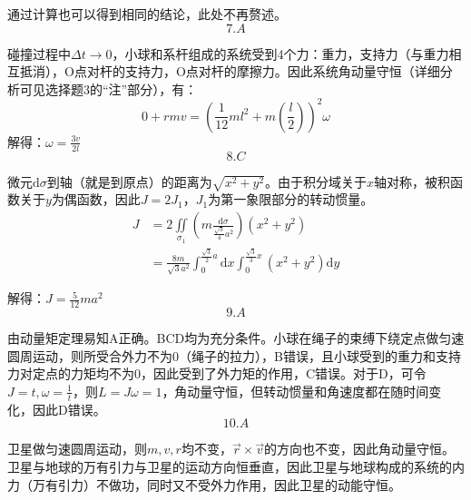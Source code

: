 \documentclass[blue, pad]{./templete/qyxfnote}
\newcommand{\di}[1]{\mathrm{d}#1}
\newcommand{\zbj}[4]
{
	\draw (0,0) node[below left] {$ O $};
	\draw [->] (#1,0) -- (#2,0) node[right] {$ x $};
	\draw [->] (0,#3) -- (0,#4) node[right] {$ y $};
}
\begin{document}
			通过计算也可以得到相同的结论，此处不再赘述。
			\[7.A\]\par
			碰撞过程中$ \Delta t\to 0 $，小球和系杆组成的系统受到4个力：重力，支持力（与重力相互抵消），O点对杆的支持力，O点对杆的摩擦力。因此系统角动量守恒（详细分析可见选择题3的“注”部分），有：
			\[0+rmv=(\frac{1}{12}ml^2+m\left(\frac{l}{2}\right))^2\omega\]
			解得：$\omega=\frac{3v}{2l}$
			\[8.C\]\par
			\par
			微元$ \di{\sigma} $到轴（就是到原点）的距离为$ \sqrt{x^2+y^2} $。由于积分域关于$ x $轴对称，被积函数关于$ y $为偶函数，因此$ J=2J_1 $，$ J_1 $为第一象限部分的转动惯量。
			\begin{align*}
			J&=2\iint\limits_{\sigma_1}\left(m\frac{\di{\sigma}}{\frac{\sqrt{3}}{4}a^2}\right)(x^2+y^2)\\
			&=\frac{8m}{\sqrt{3}a^2}\int_0^{\frac{\sqrt{3}}{2}a}\di{x}\int_0^{\frac{\sqrt{3}}{3}x}(x^2+y^2)\di{y}
			\end{align*}\par
			解得：$ J=\frac{5}{12}ma^2 $
			\[9.A\]\par
			由动量矩定理易知A正确。BCD均为充分条件。小球在绳子的束缚下绕定点做匀速圆周运动，则所受合外力不为0（绳子的拉力），B错误，且小球受到的重力和支持力对定点的力矩均不为0，因此受到了外力矩的作用，C错误。对于D，可令$ J=t,\omega=\frac{1}{t} $，则$ L=J\omega=1 $，角动量守恒，但转动惯量和角速度都在随时间变化，因此D错误。
			\[10.A\]\par
			卫星做匀速圆周运动，则$ m,v,r $均不变，$ \vec{r}\times\vec{v} $的方向也不变，因此角动量守恒。卫星与地球的万有引力与卫星的运动方向恒垂直，因此卫星与地球构成的系统的内力（万有引力）不做功，同时又不受外力作用，因此卫星的动能守恒。
\end{document}
